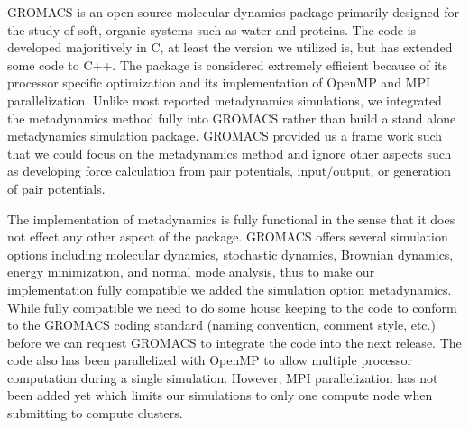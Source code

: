 GROMACS is an open-source molecular dynamics package primarily designed for the study of soft, organic systems such as water and proteins.  The code is developed majoritively  in C, at least the version we utilized is, but has extended some code to C++.  The package is considered extremely efficient because of its processor specific optimization and its implementation of OpenMP and MPI parallelization.  Unlike most reported metadynamics simulations, we integrated the metadynamics method fully into GROMACS rather than build a stand alone metadynamics simulation package.  GROMACS provided us a frame work such that we could focus on the metadynamics method and ignore other aspects such as developing force calculation from pair potentials, input/output, or generation of pair potentials.  

The implementation of metadynamics is fully functional in the sense that it does not effect any other aspect of the package.  GROMACS offers several simulation options including molecular dynamics, stochastic dynamics, Brownian dynamics, energy minimization, and normal mode analysis, thus to make our implementation fully compatible we added the simulation option metadynamics.  While fully compatible we need to do some house keeping to the code to conform to the GROMACS coding standard (naming convention, comment style, etc.) before we can request GROMACS to integrate the code into the next release.  The code also has been parallelized with OpenMP to allow multiple processor computation during a single simulation.  However, MPI parallelization has not been added yet which limits our simulations to only one compute node when submitting to compute clusters.

